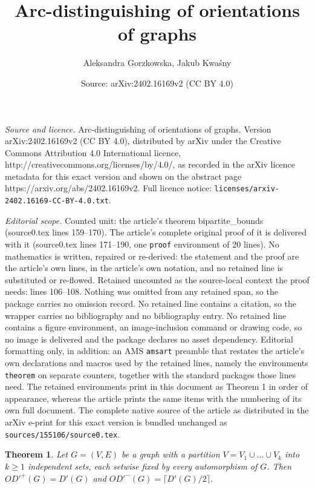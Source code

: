 \documentclass[10pt,a4paper]{amsart}
\title{Arc-distinguishing of orientations of graphs}
\author{Aleksandra Gorzkowska, Jakub Kwa\'sny}
\date{Source: arXiv:2402.16169v2 (CC BY 4.0)}
\newtheorem{theorem}{Theorem}
\begin{document}
\maketitle

\noindent\emph{Source and licence.} Arc-distinguishing of orientations of graphs. Version arXiv:2402.16169v2 (CC BY 4.0), distributed by arXiv under the Creative Commons Attribution 4.0 International licence, http://creativecommons.org/licenses/by/4.0/, as recorded in the arXiv licence metadata for this exact version and shown on the abstract page https://arxiv.org/abs/2402.16169v2. Full licence notice: \texttt{licenses/arxiv-2402.16169-CC-BY-4.0.txt}.\par\smallskip

\noindent\textit{Editorial scope.} Counted unit: the article's theorem bipartite\_bounds (source0.tex lines 159--170). The article's complete original proof of it is delivered with it (source0.tex lines 171--190, one \texttt{proof} environment of 20 lines). No mathematics is written, repaired or re-derived: the statement and the proof are the article's own lines, in the article's own notation, and no retained line is substituted or re-flowed.  Retained uncounted as the source-local context the proof needs: lines 106--108.  Nothing was omitted from any retained span, so the package carries no omission record.  No retained line contains a citation, so the wrapper carries no bibliography and no bibliography entry.  No retained line contains a figure environment, an image-inclusion command or drawing code, so no image is delivered and the package declares no asset dependency.  Editorial formatting only, in addition: an AMS \texttt{amsart} preamble that restates the article's own declarations and macros used by the retained lines, namely the environments \texttt{theorem} on separate counters, together with the standard packages those lines need.  The retained environments print in this document as Theorem 1 in order of appearance, whereas the article prints the same items with the numbering of its own full document.  The complete native source of the article as distributed in the arXiv e-print for this exact version is bundled unchanged as \texttt{sources/155106/source0.tex}.
\begin{theorem} \label{lemma: part_indep}
Let $G=(V,E)$ be a graph with a partition $V=V_1\cup\dots\cup V_k$ into $k\geq 1$ independent sets, each setwise fixed by every automorphism of $G$. Then $OD'^+(G)=D'(G)$ and $OD'^-(G)=\lceil D'(G)/2\rceil$.
\end{theorem}
\end{document}
